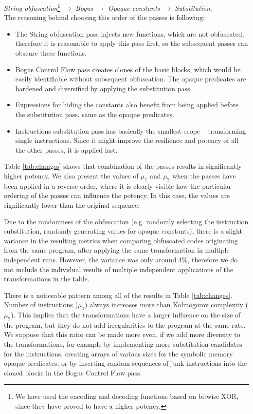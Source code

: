 \documentclass[
  digital, %
  notable,   %
  twoside, %
  nolof,     %
  nolot,     %
]{fithesis3}
\theoremstyle{definition}
\begin{document}
\textit{String obfuscation}\footnote{We have used the encoding and decoding functions based on bitwise XOR, since they have proved to have a higher potency.} $\rightarrow$ \textit{Bogus} $\rightarrow$ \textit{Opaque constants} $\rightarrow$ \textit{Substitution}. \\

The reasoning behind choosing this order of the passes is following: 

\begin{itemize}
    \item The String obfuscation pass injects new functions, which are not obfuscated, therefore it is reasonable to apply this pass first, so the subsequent passes can obscure these functions.
    \item Bogus Control Flow pass creates clones of the basic blocks, which would be easily identifiable without subsequent obfuscation. The opaque predicates are hardened and diversified by applying the substitution pass. 
    \item Expressions for hiding the constants also benefit from being applied before the substitution pass, same as the opaque predicates.
    \item Instructions substitution pass has basically the smallest scope -- transforming single instructions. Since it might improve the resilience and potency of all the other passes, it is applied last.
\end{itemize}

Table \ref{tab:changes} shows that combination of the passes results in significantly higher potency. We also present the values of $\mu_1$ and $\mu_2$ when the passes have been applied in a reverse order, where it is clearly visible how the particular ordering of the passes can influence the potency. In this case, the values are significantly lower than the original sequence. 

Due to the randomness of the obfuscation (e.g. randomly selecting the instruction substitution, randomly generating values for opaque constants), there is a slight variance in the resulting metrics when comparing obfuscated codes originating from the same program, after applying the same transformation in multiple independent runs. However, the variance was only around 4\%, therefore we do not include the individual results of multiple independent applications of the transformations in the table.

There is a noticeable pattern among all of the results in Table \ref{tab:changes}. Number of instructions ($\mu_1$) always increases more than Kolmogorov complexity ($\mu_2$). This implies that the transformations have a larger influence on the size of the program, but they do not add irregularities to the program at the same rate. We suppose that this ratio can be made more even, if we add more diversity to the transformations, for example by implementing more substitution candidates for the instructions, creating arrays of various sizes for the symbolic memory opaque predicates, or by inserting random sequences of junk instructions into the cloned blocks in the Bogus Control Flow pass.
\end{document}
